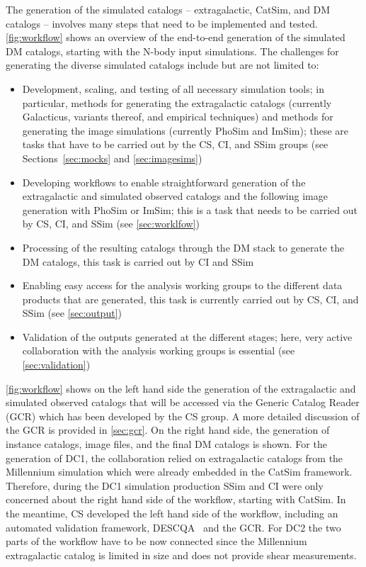 \documentclass[preprint,times]{aastex61}
\begin{document}
The generation of the simulated catalogs -- extragalactic, CatSim, and DM catalogs -- involves many steps that need to be implemented and tested. \autoref{fig:workflow} shows an overview of the end-to-end generation of the simulated DM catalogs, starting with the N-body input simulations. The challenges for generating the diverse simulated catalogs include but are not limited to:
\begin{itemize}
\item Development, scaling, and testing of all necessary simulation tools; in particular, methods for generating the extragalactic catalogs (currently Galacticus, variants thereof, and empirical techniques) and methods for generating the image simulations (currently PhoSim and ImSim); these are tasks that have to be carried out by the CS, CI, and SSim groups (see Sections~\ref{sec:mocks} and \ref{sec:imagesims})
\item Developing workflows to enable straightforward generation of the extragalactic and simulated observed catalogs and the following image generation with PhoSim or ImSim; this is a task that needs to be carried out by CS, CI, and SSim (see \autoref{sec:worklfow})
\item Processing of the resulting catalogs through the DM stack to generate the DM catalogs, this task is carried out by CI and SSim
\item Enabling easy access for the analysis working groups to the different data products that are generated, this task is currently carried out by CS, CI, and SSim (see \autoref{sec:output})
\item Validation of the outputs generated at the different stages; here, very active collaboration with the analysis working groups is essential (see \autoref{sec:validation})
\end{itemize}

\autoref{fig:workflow} shows on the left hand side the generation of the extragalactic and simulated observed catalogs that will be accessed via the Generic Catalog Reader (GCR) which has been developed by the CS group. A more detailed discussion of the GCR is provided in \autoref{sec:gcr}. On the right hand side, the generation of instance catalogs, image files, and the final DM catalogs is shown. For the generation of DC1, the collaboration relied on extragalactic catalogs from the Millennium simulation which were already embedded in the CatSim framework. Therefore, during the DC1 simulation production SSim and CI were only concerned about the right hand side of the workflow, starting with CatSim. In the meantime, CS developed the left hand side of the workflow, including an automated validation framework, DESCQA~\cite{descqa} and the GCR. For DC2 the two parts of the workflow have to be now connected since the Millennium extragalactic catalog is limited in size and does not provide shear measurements. 
\end{document}
